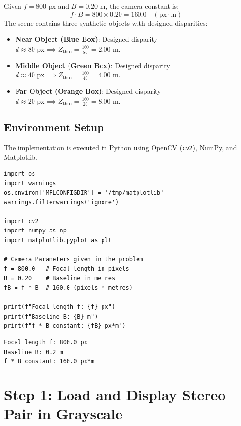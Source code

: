\documentclass[12pt]{article}
\begin{document}
Given $f = 800\text{ px}$ and $B = 0.20\text{ m}$, the camera constant is:
\begin{equation}
f \cdot B = 800 \times 0.20 = 160.0 \quad (\text{px}\cdot\text{m})
\end{equation}
The scene contains three synthetic objects with designed disparities:
\begin{itemize}
    \item \textbf{Near Object (Blue Box)}: Designed disparity $d \approx 80\text{ px} \implies Z_{\text{theo}} = \frac{160}{80} = 2.00\text{ m}$.
    \item \textbf{Middle Object (Green Box)}: Designed disparity $d \approx 40\text{ px} \implies Z_{\text{theo}} = \frac{160}{40} = 4.00\text{ m}$.
    \item \textbf{Far Object (Orange Box)}: Designed disparity $d \approx 20\text{ px} \implies Z_{\text{theo}} = \frac{160}{20} = 8.00\text{ m}$.
\end{itemize}

\subsection{Environment Setup}
The implementation is executed in Python using OpenCV (\texttt{cv2}), NumPy, and Matplotlib.

\begin{lstlisting}[style=code, caption={Setup and Camera Constants Initialization}]
import os
import warnings
os.environ['MPLCONFIGDIR'] = '/tmp/matplotlib'
warnings.filterwarnings('ignore')

import cv2
import numpy as np
import matplotlib.pyplot as plt

# Camera Parameters given in the problem
f = 800.0   # Focal length in pixels
B = 0.20    # Baseline in metres
fB = f * B  # 160.0 (pixels * metres)

print(f"Focal length f: {f} px")
print(f"Baseline B: {B} m")
print(f"f * B constant: {fB} px*m")
\end{lstlisting}

\begin{lstlisting}[style=output, caption={Console Output of Camera Constants}]
Focal length f: 800.0 px
Baseline B: 0.2 m
f * B constant: 160.0 px*m
\end{lstlisting}

\section{Step 1: Load and Display Stereo Pair in Grayscale}
\end{document}

